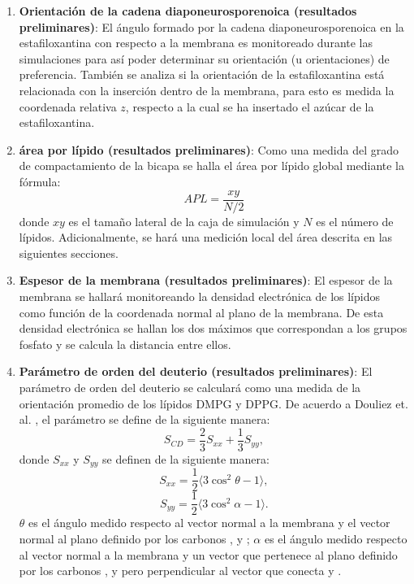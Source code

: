 \begin{enumerate}
\item \textbf{Orientaci\'{o}n de la cadena diaponeurosporenoica (resultados preliminares)}: El \'{a}ngulo formado por la cadena diaponeurosporenoica en la estafiloxantina con respecto a la membrana es monitoreado durante las simulaciones para as\'{i} poder determinar su orientaci\'{o}n (u orientaciones) de preferencia. Tambi\'{e}n se analiza si la orientaci\'{o}n de la estafiloxantina est\'{a} relacionada con la inserci\'{o}n dentro de la membrana, para esto es medida la coordenada relativa $z$, respecto a la cual se ha insertado el az\'{u}car de la estafiloxantina.\\

\item \textbf{\'{a}rea por l\'{i}pido (resultados preliminares)}: Como una medida del grado de compactamiento de la bicapa se halla el \'{a}rea por l\'{i}pido global mediante la f\'{o}rmula:
\begin{equation}
APL=\frac{xy}{N/2}
\end{equation}\label{eq:aplglobal}
donde $xy$ es el tama\~no lateral de la caja de simulaci\'{o}n y $N$ es el n\'{u}mero de l\'{i}pidos.
Adicionalmente, se har\'{a} una medici\'{o}n local del \'{a}rea descrita en las siguientes secciones.
\item \textbf{Espesor de la membrana (resultados preliminares)}:
El espesor de la membrana se hallar\'{a} monitoreando la densidad electr\'{o}nica de los l\'{i}pidos como funci\'{o}n de la coordenada normal al plano de la membrana. De esta densidad electr\'{o}nica se hallan los dos m\'{a}ximos que correspondan a los grupos fosfato y se calcula la distancia entre ellos.
\item  \textbf{Par\'{a}metro de orden del deuterio (resultados preliminares)}:
El par\'{a}metro de orden del deuterio se calcular\'{a} como una medida de la orientaci\'{o}n promedio de los l\'{i}pidos DMPG y DPPG. De acuerdo a Douliez et. al. \cite{Douliez1998OnBiomembranes} , el par\'{a}metro se define de la siguiente manera: \\
\begin{equation}
S_{CD}=\frac{2}{3}S_{xx}+\frac{1}{3}S_{yy},
 \end{equation}
donde $S_{xx}$ y $S_{yy}$ se definen de la siguiente manera:
\begin{equation}
S_{xx}=\frac{1}{2}\langle 3\cos^2\theta-1\rangle,
 \end{equation}
\begin{equation}
S_{yy}=\frac{1}{2}\langle 3\cos^2\alpha-1\rangle.
 \end{equation}
$\theta$ es el \'{a}ngulo medido respecto al vector normal a la membrana y el vector normal al plano definido por los carbonos ,  y ; $\alpha$ es el \'{a}ngulo medido respecto al vector normal a la membrana y un vector que pertenece al plano definido por los carbonos ,  y  pero perpendicular al vector que conecta   y .


\end{enumerate}

